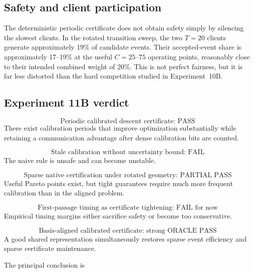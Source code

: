 \subsection{Safety and client participation}

The deterministic periodic certificate does not obtain safety simply by silencing the slowest clients. In the rotated transition sweep, the two $T=20$ clients generate approximately 19\% of candidate events. Their accepted-event share is approximately 17--19\% at the useful $C=25$--$75$ operating points, reasonably close to their intended combined weight of 20\%. This is not perfect fairness, but it is far less distorted than the hard competition studied in Experiment~10B.

\subsection{Experiment 11B verdict}

\begin{equation}
  \boxed{\text{Periodic calibrated descent certificate: PASS}}
\end{equation}
There exist calibration periods that improve optimization substantially while retaining a communication advantage after dense calibration bits are counted.

\begin{equation}
  \boxed{\text{Stale calibration without uncertainty bound: FAIL}}
\end{equation}
The naive rule is unsafe and can become unstable.

\begin{equation}
  \boxed{\text{Sparse native certification under rotated geometry: PARTIAL PASS}}
\end{equation}
Useful Pareto points exist, but tight guarantees require much more frequent calibration than in the aligned problem.

\begin{equation}
  \boxed{\text{First-passage timing as certificate tightening: FAIL for now}}
\end{equation}
Empirical timing margins either sacrifice safety or become too conservative.

\begin{equation}
  \boxed{\text{Basis-aligned calibrated certificate: strong ORACLE PASS}}
\end{equation}
A good shared representation simultaneously restores sparse event efficiency and sparse certificate maintenance.

The principal conclusion is
\begin{center}
\end{center}
